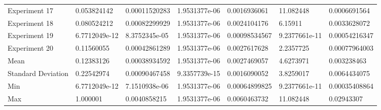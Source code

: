 \begin{tabular}{lllllll}
Experiment 17 & 0.053824142 & 0.00011520283 & 1.9531377e-06 & 0.0016936061 & 11.082448 & 0.0006691564 \\
Experiment 18 & 0.080524212 & 0.00082299929 & 1.9531377e-06 & 0.0024104176 & 6.15911 & 0.0033628072 \\
Experiment 19 & 6.7712049e-12 & 8.3752345e-05 & 1.9531377e-06 & 0.00098534567 & 9.2377661e-11 & 0.00054216347 \\
Experiment 20 & 0.11560055 & 0.00042861289 & 1.9531377e-06 & 0.0027617628 & 2.2357725 & 0.00077964003 \\
Mean & 0.12383126 & 0.00038934592 & 1.9531377e-06 & 0.0027469057 & 4.6273971 & 0.003238463 \\
Standard Deviation & 0.22542974 & 0.00090467458 & 9.3357739e-15 & 0.0016090052 & 3.8259017 & 0.0064434075 \\
Min & 6.7712049e-12 & 7.1510938e-06 & 1.9531377e-06 & 0.00064899825 & 9.2377661e-11 & 0.00035408864 \\
Max & 1.000001 & 0.0040858215 & 1.9531377e-06 & 0.0060463732 & 11.082448 & 0.02943307 \\
\hline
\end{tabular}
